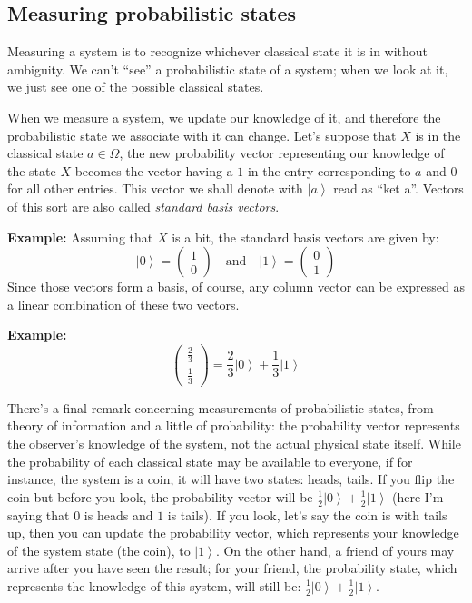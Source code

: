 \documentclass[12pt]{article} %
\newcommand{\ket}[1]{\left|#1\right\rangle}
\begin{document}
\subsection{Measuring probabilistic states}
Measuring a system is to recognize whichever classical state it is in without ambiguity. We can't ``see'' a probabilistic state of a system; when we look at it, we just see one of the possible classical states.

When we measure a system, we update our knowledge of it, and therefore the probabilistic state we associate with it can change. Let's suppose that $X$ is in the classical state $a \in \Omega$, the new probability vector representing our knowledge of the state $X$ becomes the vector having a $1$ in the entry corresponding to $a$ and $0$ for all other entries. This vector we shall denote with $\ket{a}$ read as ``ket a''. Vectors of this sort are also called \textit{standard basis vectors}.

\textbf{Example:} Assuming that $X$ is a bit, the standard basis vectors are given by:
\[
\ket{0} = \begin{pmatrix} 1 \\ 0 \end{pmatrix} \quad \text{and} \quad \ket{1} = \begin{pmatrix} 0 \\ 1\end{pmatrix}
\]
Since those vectors form a basis, of course, any column vector can be expressed as a linear combination of these two vectors.

\textbf{Example:}
\[
\begin{pmatrix} \frac{2}{3} \\ \frac{1}{3} \end{pmatrix} = \frac{2}{3}\ket{0} + \frac{1}{3}\ket{1}
\]

There's a final remark concerning measurements of probabilistic states, from theory of information and a little of probability: the probability vector represents the observer's knowledge of the system, not the actual physical state itself. While the probability of each classical state may be available to everyone, if for instance, the system is a coin, it will have two states: heads, tails. If you flip the coin but before you look, the probability vector will be $\frac{1}{2}\ket{0} + \frac{1}{2}\ket{1}$ (here I'm saying that $0$ is heads and $1$ is tails). If you look, let's say the coin is with tails up, then you can update the probability vector, which represents your knowledge of the system state (the coin), to $\ket{1}$. On the other hand, a friend of yours may arrive after you have seen the result; for your friend, the probability state, which represents the knowledge of this system, will still be: $\frac{1}{2}\ket{0} + \frac{1}{2}\ket{1}$.
\end{document}
